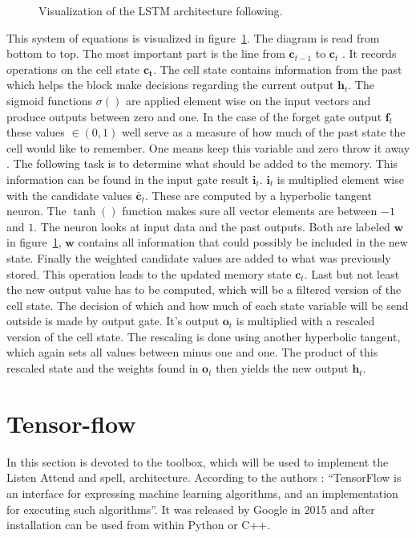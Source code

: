 \begin{figure}

\caption{Visualization of the LSTM architecture following.}
\label{fig:lstm}
\end{figure}
This system of equations is visualized in figure~\ref{fig:lstm}. The diagram is read from bottom to top. The most important part is the line from $\mathbf{c}_{t-1}$ to $\mathbf{c}_{t}$ \cite{Colah2015}. It records operations on the cell state $\mathbf{c_t}$. The cell state contains information from the past which helps the block make decisions regarding the current output $\mathbf{h}_t$. The sigmoid functions $\sigma()$ are applied element wise on the input vectors and produce outputs between zero and one. In the case of the forget gate output $\mathbf{f}_t$ these values $\in (0,1)$ well serve as a measure of how much of the past state the cell would like to remember. One means keep this variable and zero throw it away \cite{Colah2015}. 
The following task is to determine what should be added to the memory. This information can be found in the input gate result $\mathbf{i}_t$. $\mathbf{i}_t$ is multiplied element wise with the candidate values $\mathbf{\bar{c}}_t$. These are computed by a hyperbolic tangent neuron.  The $\tanh()$ function makes sure all vector elements are between $-1$ and $1$. The neuron looks at input data and the past outputs. Both are labeled $\mathbf{w}$ in figure~\ref{fig:lstm}, $\mathbf{w}$ contains all information that could possibly be included in the new state. Finally the weighted candidate values are added to what was previously stored. This operation leads to the updated memory state $\mathbf{c}_t$. 
Last but not least the new output value has to be computed, which will be a filtered version of the cell state. The decision of which and how much of each state variable will be send outside is made by output gate. It's output $\mathbf{o}_t$ is multiplied with a rescaled version of the cell state. The rescaling is done using another hyperbolic tangent, which again sets all values between minus one and one. The product of this rescaled state and the weights found in $\mathbf{o}_t$ then yields the new output $\mathbf{h}_t$. 

\section{Tensor-flow}
In this section is devoted to the toolbox, which will be used to implement the Listen Attend and spell, architecture. According to the authors \cite{Agarwal2015}: 
\textquotedblleft TensorFlow is an interface for expressing machine learning algorithms, and an implementation for executing such algorithms\textquotedblright . It was released by Google in 2015 and after installation can be used from within Python or C++. 




